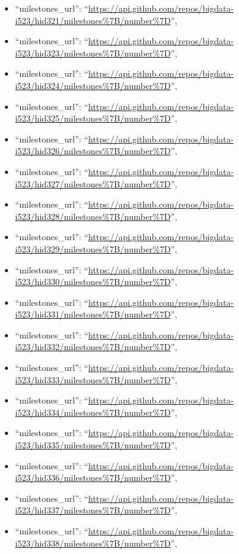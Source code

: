 \begin{itemize}
\item
  ``milestones\_url'':
  ``\url{https://api.github.com/repos/bigdata-i523/hid321/milestones\%7B/number\%7D}'',
\item
  ``milestones\_url'':
  ``\url{https://api.github.com/repos/bigdata-i523/hid323/milestones\%7B/number\%7D}'',
\item
  ``milestones\_url'':
  ``\url{https://api.github.com/repos/bigdata-i523/hid324/milestones\%7B/number\%7D}'',
\item
  ``milestones\_url'':
  ``\url{https://api.github.com/repos/bigdata-i523/hid325/milestones\%7B/number\%7D}'',
\item
  ``milestones\_url'':
  ``\url{https://api.github.com/repos/bigdata-i523/hid326/milestones\%7B/number\%7D}'',
\item
  ``milestones\_url'':
  ``\url{https://api.github.com/repos/bigdata-i523/hid327/milestones\%7B/number\%7D}'',
\item
  ``milestones\_url'':
  ``\url{https://api.github.com/repos/bigdata-i523/hid328/milestones\%7B/number\%7D}'',
\item
  ``milestones\_url'':
  ``\url{https://api.github.com/repos/bigdata-i523/hid329/milestones\%7B/number\%7D}'',
\item
  ``milestones\_url'':
  ``\url{https://api.github.com/repos/bigdata-i523/hid330/milestones\%7B/number\%7D}'',
\item
  ``milestones\_url'':
  ``\url{https://api.github.com/repos/bigdata-i523/hid331/milestones\%7B/number\%7D}'',
\item
  ``milestones\_url'':
  ``\url{https://api.github.com/repos/bigdata-i523/hid332/milestones\%7B/number\%7D}'',
\item
  ``milestones\_url'':
  ``\url{https://api.github.com/repos/bigdata-i523/hid333/milestones\%7B/number\%7D}'',
\item
  ``milestones\_url'':
  ``\url{https://api.github.com/repos/bigdata-i523/hid334/milestones\%7B/number\%7D}'',
\item
  ``milestones\_url'':
  ``\url{https://api.github.com/repos/bigdata-i523/hid335/milestones\%7B/number\%7D}'',
\item
  ``milestones\_url'':
  ``\url{https://api.github.com/repos/bigdata-i523/hid336/milestones\%7B/number\%7D}'',
\item
  ``milestones\_url'':
  ``\url{https://api.github.com/repos/bigdata-i523/hid337/milestones\%7B/number\%7D}'',
\item
  ``milestones\_url'':
  ``\url{https://api.github.com/repos/bigdata-i523/hid338/milestones\%7B/number\%7D}'',

\end{itemize}
